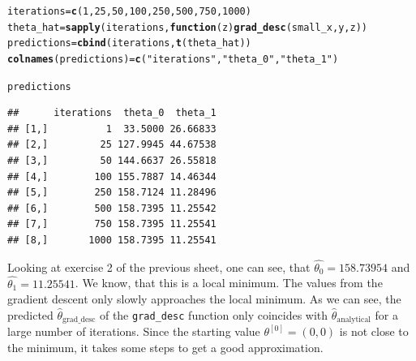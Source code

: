 \documentclass[a4paper]{article}
\makeatletter
\newcommand{\hlnum}[1]{\textcolor[rgb]{0.686,0.059,0.569}{#1}}%
\newcommand{\hlstr}[1]{\textcolor[rgb]{0.192,0.494,0.8}{#1}}%
\newcommand{\hlstd}[1]{\textcolor[rgb]{0.345,0.345,0.345}{#1}}%
\newcommand{\hlkwa}[1]{\textcolor[rgb]{0.161,0.373,0.58}{\textbf{#1}}}%
\newcommand{\hlkwb}[1]{\textcolor[rgb]{0.69,0.353,0.396}{#1}}%
\newcommand{\hlkwc}[1]{\textcolor[rgb]{0.333,0.667,0.333}{#1}}%
\newcommand{\hlkwd}[1]{\textcolor[rgb]{0.737,0.353,0.396}{\textbf{#1}}}%
\newenvironment{kframe}{%
 \def\at@end@of@kframe{}%
 \ifinner\ifhmode%
  \def\at@end@of@kframe{\end{minipage}}%
  \begin{minipage}{\columnwidth}%
 \fi\fi%
 \def\FrameCommand##1{\hskip\@totalleftmargin \hskip-\fboxsep
 \colorbox{shadecolor}{##1}\hskip-\fboxsep
     \hskip-\linewidth \hskip-\@totalleftmargin \hskip\columnwidth}%
 \MakeFramed {\advance\hsize-\width
   \@totalleftmargin\z@ \linewidth\hsize
   \@setminipage}}%
 {\par\unskip\endMakeFramed%
 \at@end@of@kframe}
\newenvironment{knitrout}{}{} %
\makeatother
\begin{document}
{\begin{enumerate}[a)]
\begin{knitrout}
\color{fgcolor}\begin{kframe}
\begin{alltt}
\hlstd{iterations} \hlkwb{=} \hlkwd{c}\hlstd{(}\hlnum{1}\hlstd{,} \hlnum{25}\hlstd{,} \hlnum{50}\hlstd{,} \hlnum{100}\hlstd{,} \hlnum{250}\hlstd{,} \hlnum{500}\hlstd{,} \hlnum{750}\hlstd{,} \hlnum{1000}\hlstd{)}
\hlstd{theta_hat} \hlkwb{=} \hlkwd{sapply}\hlstd{(iterations,} \hlkwa{function}\hlstd{(}\hlkwc{z}\hlstd{)} \hlkwd{grad_desc}\hlstd{(small_x, y, z))}
\hlstd{predictions} \hlkwb{=} \hlkwd{cbind}\hlstd{(iterations,} \hlkwd{t}\hlstd{(theta_hat))}
\hlkwd{colnames}\hlstd{(predictions)} \hlkwb{=} \hlkwd{c}\hlstd{(}\hlstr{"iterations"}\hlstd{,} \hlstr{"theta_0"}\hlstd{,} \hlstr{"theta_1"}\hlstd{)}

\hlstd{predictions}
\end{alltt}
\begin{verbatim}
##      iterations  theta_0  theta_1
## [1,]          1  33.5000 26.66833
## [2,]         25 127.9945 44.67538
## [3,]         50 144.6637 26.55818
## [4,]        100 155.7887 14.46344
## [5,]        250 158.7124 11.28496
## [6,]        500 158.7395 11.25542
## [7,]        750 158.7395 11.25541
## [8,]       1000 158.7395 11.25541
\end{verbatim}
\end{kframe}
\end{knitrout}

Looking at exercise 2 of the previous sheet, one can see, that
$\hat{\theta_0} = 158.73954$ and $\hat{\theta_1} = 11.25541$. We know, that
this is a local minimum. The values from the gradient descent only slowly
approaches the local minimum. As we can see, the predicted $\hat{\theta}_{\mathrm{grad\_desc}}$ of the
\texttt{grad\_desc} function only coincides with $\hat{\theta}_{\mathrm{analytical}}$
for a large number of iterations. Since the starting value $\theta^{[0]} = (0 ,0)$
is not close to the minimum, it takes some steps to get a good approximation.

\end{enumerate}
}

\newpage
\end{document}
